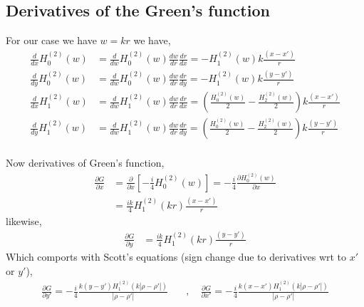 \documentclass{article}
\newcommand{\0}{\varnothing}
\begin{document}
\subsection{Derivatives of the Green's function}
For our case we have $w = kr$ we have,
\begin{align*}
    \frac{d}{dx} H_0^{(2)}(w) &=  \frac{d}{dw} H_0^{(2)}(w) \frac{dw}{dr} \frac{dr}{dx} = - H_{1}^{(2)}(w) k  \frac{(x-x')}{r} \\  
    \frac{d}{dy} H_0^{(2)}(w) &=  \frac{d}{dw} H_0^{(2)}(w) \frac{dw}{dr} \frac{dr}{dy} = - H_{1}^{(2)}(w) k  \frac{(y-y')}{r} \\  
    \frac{d}{dx}  H_1^{(2)}(w) &= \frac{d}{dw}  H_1^{(2)}(w) \frac{dw}{dr} \frac{dr}{dx}  = \left(\frac{H_{0}^{(2)}(w)}{2} - \frac{H_{2}^{(2)}(w)}{2} \right)  k  \frac{(x-x')}{r}\\
    \frac{d}{dy}  H_1^{(2)}(w) &= \frac{d}{dw}  H_1^{(2)}(w) \frac{dw}{dr} \frac{dr}{dy}  = \left(\frac{H_{0}^{(2)}(w)}{2} - \frac{H_{2}^{(2)}(w)}{2} \right)  k  \frac{(y-y')}{r}\\
\end{align*}


Now derivatives of Green's function,
\begin{align*}
    \frac{\partial G}{\partial x} &= \frac{\partial }{\partial x} \left[ -\frac{i}{4}H_0^{(2)}(w) \right] = -\frac{i}{4} \frac{\partial H_0^{(2)}(w)}{\partial x} \\
    &= \frac{ik}{4}  H_{1}^{(2)}(kr) \frac{(x-x')}{r}
\end{align*}
likewise, 
\begin{align*}
    \frac{\partial G}{\partial y} &= \frac{ik}{4}  H_{1}^{(2)}(kr) \frac{(y-y')}{r}
\end{align*}
Which comports with Scott's equations (sign change due to derivatives wrt to $x'$ or $y'$),
\begin{align*}
    \frac{\partial G}{\partial y'} = -\frac{i}{4}\frac{k(y-y')H_1^{(2)}(k|\rho-\rho'|)}{|\rho-\rho'|} \quad &,\quad
    \frac{\partial G}{\partial x'} = -\frac{i}{4}\frac{k(x-x')H_1^{(2)}(k|\rho-\rho'|)}{|\rho-\rho'|}
\end{align*}
\end{document}
